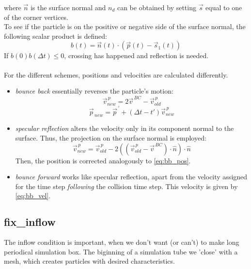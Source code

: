 \documentclass[a4paper,10pt]{scrreprt}
\begin{document}
where $\vec{n}$ is the surface normal and $n_d$ can be obtained by setting $\vec{s}$ equal to one of the corner vertices.\\To see if the particle is on the positive or negative side of the surface normal, the following scalar product is defined:
\begin{equation}
b(t) = \vec{n}(t) \cdot \left( \vec{p}(t) - \vec{s}_1 (t) \right)
\end{equation}
If $b(0)b(\Delta t) \leq 0$, crossing has happened and reflection is needed.\\ \\
For the different schemes, positions and velocities are calculated differently.\\
\begin{itemize}
\item \textit{bounce back} essentially reverses the particle's motion:
\begin{equation}
\label{eq:bb_vel}
\vec{v}^{\,p}_{new} = 2\vec{v}^{\, BC} - \vec{v}^{\,p}_{ old}
\end{equation}
\begin{equation}
\label{eq:bb_pos}
\vec{p}_{\, new} = \vec{p}^{\,'} + \left(\Delta t - t'\right) \vec{v}^{\,p}_{new}
\end{equation}

\item \textit{specular reflection} alters the velocity only in its component normal to the surface. Thus, the projection on the surface normal is employed:
\begin{equation}
\label{sr_vel}
\vec{v}^{\,p}_{new} = \vec{v}^{\,p}_{old} - 2\left(\left(\vec{v}^{\,p}_{old} - \vec{v}^{\, BC}\right) \cdot \hat{n}\right) \cdot \hat{n}
\end{equation}
Then, the position is corrected analogously to \eqref{eq:bb_pos}.

\item \textit{bounce forward} works like specular reflection, apart from the velocity assigned for the time step \textit{following} the collision time step. This velocity is given by \eqref{eq:bb_vel}.
\end{itemize}

\subsection{fix\_inflow}

The inflow condition is important, when we don't want (or can't) to make long periodical simulation box. The biginning of a simulation tube we 'close' with a mesh, which creates particles with desired characteristics.
\end{document}
